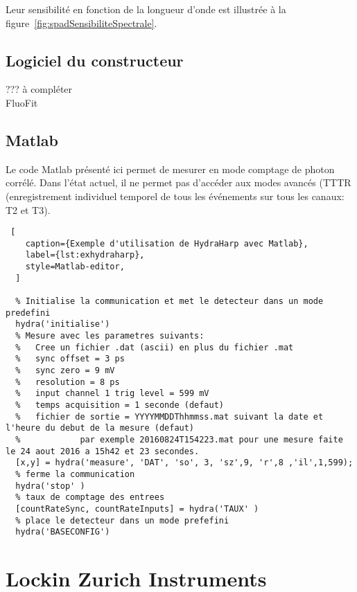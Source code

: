 \documentclass[11pt,francais]{book} %
\begin{document}
Leur sensibilité en fonction de la longueur d'onde est illustrée à la figure~\ref{fig:spadSensibiliteSpectrale}.

\subsection{Logiciel du constructeur}

??? à compléter \\
FluoFit

\subsection{Matlab}

Le code Matlab présenté ici permet de mesurer en mode comptage de photon corrélé.
Dans l'état actuel, il ne permet pas d'accéder aux modes avancés (TTTR (enregistrement individuel temporel de tous les événements sur tous les canaux: T2 et T3).

\begin{lstlisting} [
    caption={Exemple d'utilisation de HydraHarp avec Matlab},
    label={lst:exhydraharp},
    style=Matlab-editor,
  ]
  
  % Initialise la communication et met le detecteur dans un mode predefini
  hydra('initialise')
  % Mesure avec les parametres suivants:
  %   Cree un fichier .dat (ascii) en plus du fichier .mat
  %   sync offset = 3 ps
  %   sync zero = 9 mV
  %   resolution = 8 ps
  %   input channel 1 trig level = 599 mV
  %   temps acquisition = 1 seconde (defaut)
  %   fichier de sortie = YYYYMMDDThhmmss.mat suivant la date et l'heure du debut de la mesure (defaut)
  %            par exemple 20160824T154223.mat pour une mesure faite le 24 aout 2016 a 15h42 et 23 secondes.
  [x,y] = hydra('measure', 'DAT', 'so', 3, 'sz',9, 'r',8 ,'il',1,599);
  % ferme la communication
  hydra('stop' )
  % taux de comptage des entrees
  [countRateSync, countRateInputs] = hydra('TAUX' )
  % place le detecteur dans un mode prefefini
  hydra('BASECONFIG')

\end{lstlisting}


\section{Lockin Zurich Instruments}
\end{document}
